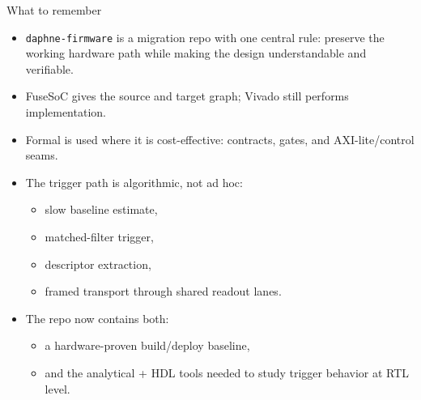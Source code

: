 \documentclass[aspectratio=169]{beamer}
\begin{document}
\begin{frame}{What to remember}
\small
\begin{itemize}
  \item \texttt{daphne-firmware} is a migration repo with one central rule: preserve the working hardware path while making the design understandable and verifiable.
  \item FuseSoC gives the source and target graph; Vivado still performs implementation.
  \item Formal is used where it is cost-effective: contracts, gates, and AXI-lite/control seams.
  \item The trigger path is algorithmic, not ad hoc:
  \begin{itemize}
    \item slow baseline estimate,
    \item matched-filter trigger,
    \item descriptor extraction,
    \item framed transport through shared readout lanes.
  \end{itemize}
  \item The repo now contains both:
  \begin{itemize}
    \item a hardware-proven build/deploy baseline,
    \item and the analytical + HDL tools needed to study trigger behavior at RTL level.
  \end{itemize}
\end{itemize}
\end{frame}
\end{document}
